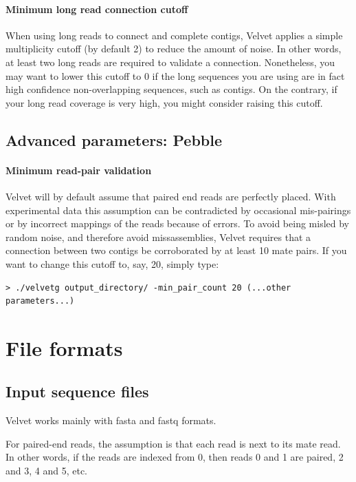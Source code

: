 \documentclass{article}
\begin{document}
\paragraph{Minimum long read connection cutoff}

When using long reads to connect and complete contigs, Velvet applies a simple multiplicity cutoff (by default 2) to reduce the amount of noise. In other words, at least two long reads are required to validate a connection. Nonetheless, you may want to lower this cutoff to 0 if the long sequences you are using are in fact high confidence non-overlapping sequences, such as contigs. On the contrary, if your long read coverage is very high, you might consider raising this cutoff.

\subsection{Advanced parameters: Pebble}

\paragraph{Minimum read-pair validation}

Velvet will by default assume that paired end reads are perfectly placed. With experimental data this assumption can be contradicted by occasional mis-pairings or by incorrect mappings of the reads because of errors. To avoid being misled by random noise, and therefore avoid missassemblies, Velvet requires that a connection between two contigs be corroborated by at least 10 mate pairs. If you want to change this cutoff to, say, 20, simply type:

\begin{verbatim}
> ./velvetg output_directory/ -min_pair_count 20 (...other parameters...)
\end{verbatim}  

\section{File formats}

\subsection{Input sequence files}

\label{sec:pairedformat}

Velvet works mainly with fasta and fastq formats. 

For paired-end reads, the assumption is that each read is next to its mate
read. In other words, if the reads are indexed from 0, then reads 0 and 1 are
paired, 2 and 3, 4 and 5, etc.  
\end{document}
